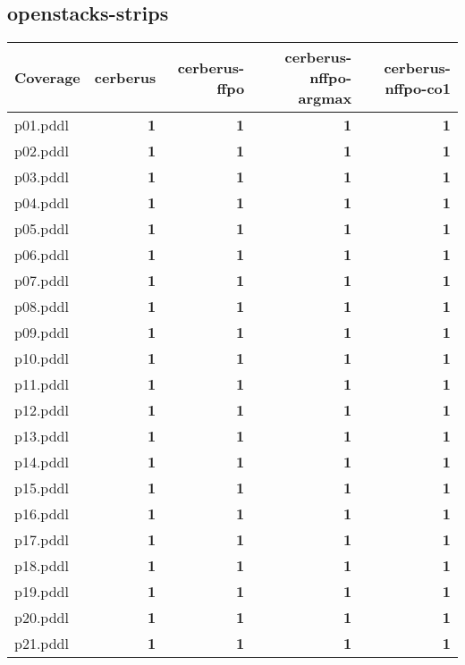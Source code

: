 \documentclass{article}
\begin{document}
\hypertarget{coverage-openstacks-strips}{}
\subsection*{openstacks-strips}

\begin{tabular}{@{}lrrrr@{}}
Coverage & cerberus & cerberus-ffpo & cerberus-nffpo-argmax & cerberus-nffpo-co1 \\
\midrule
p01.pddl & \textbf{1} & \textbf{1} & \textbf{1} & \textbf{1} \\
p02.pddl & \textbf{1} & \textbf{1} & \textbf{1} & \textbf{1} \\
p03.pddl & \textbf{1} & \textbf{1} & \textbf{1} & \textbf{1} \\
p04.pddl & \textbf{1} & \textbf{1} & \textbf{1} & \textbf{1} \\
p05.pddl & \textbf{1} & \textbf{1} & \textbf{1} & \textbf{1} \\
p06.pddl & \textbf{1} & \textbf{1} & \textbf{1} & \textbf{1} \\
p07.pddl & \textbf{1} & \textbf{1} & \textbf{1} & \textbf{1} \\
p08.pddl & \textbf{1} & \textbf{1} & \textbf{1} & \textbf{1} \\
p09.pddl & \textbf{1} & \textbf{1} & \textbf{1} & \textbf{1} \\
p10.pddl & \textbf{1} & \textbf{1} & \textbf{1} & \textbf{1} \\
p11.pddl & \textbf{1} & \textbf{1} & \textbf{1} & \textbf{1} \\
p12.pddl & \textbf{1} & \textbf{1} & \textbf{1} & \textbf{1} \\
p13.pddl & \textbf{1} & \textbf{1} & \textbf{1} & \textbf{1} \\
p14.pddl & \textbf{1} & \textbf{1} & \textbf{1} & \textbf{1} \\
p15.pddl & \textbf{1} & \textbf{1} & \textbf{1} & \textbf{1} \\
p16.pddl & \textbf{1} & \textbf{1} & \textbf{1} & \textbf{1} \\
p17.pddl & \textbf{1} & \textbf{1} & \textbf{1} & \textbf{1} \\
p18.pddl & \textbf{1} & \textbf{1} & \textbf{1} & \textbf{1} \\
p19.pddl & \textbf{1} & \textbf{1} & \textbf{1} & \textbf{1} \\
p20.pddl & \textbf{1} & \textbf{1} & \textbf{1} & \textbf{1} \\
p21.pddl & \textbf{1} & \textbf{1} & \textbf{1} & \textbf{1} \\

\end{tabular}
\end{document}
